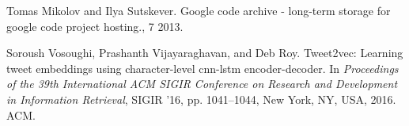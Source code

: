 \begin{thebibliography}{10}
Tomas Mikolov and Ilya Sutskever.
 Google code archive - long-term storage for google code project
  hosting., 7 2013.

Soroush Vosoughi, Prashanth Vijayaraghavan, and Deb Roy.
 Tweet2vec: Learning tweet embeddings using character-level cnn-lstm
  encoder-decoder.
 In {\em Proceedings of the 39th International ACM SIGIR Conference on
  Research and Development in Information Retrieval}, SIGIR '16, pp.
  1041--1044, New York, NY, USA, 2016. ACM.

\end{thebibliography}

